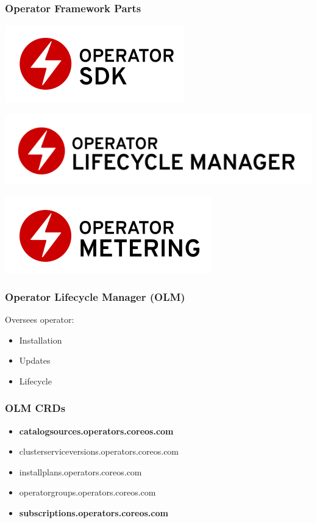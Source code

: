 \documentclass[aspectratio=169]{beamer}
\begin{document}
\begin{frame}
  \frametitle{Operator Framework Parts}

  \includegraphics[scale=.50]{images/operator_logo_sdk_color.png}

  \includegraphics[scale=.50]{images/operator_logo_lifecycle_manager_color.png}

  \includegraphics[scale=.50]{images/operator_logo_metering_color.png}

\end{frame}

\begin{frame}
  \frametitle{Operator Lifecycle Manager (OLM)}

  Oversees operator:
  \begin{itemize}
  \item Installation
  \item Updates
  \item Lifecycle
  \end{itemize}

\end{frame}

\begin{frame}
  \frametitle{OLM CRDs}
  \begin{itemize}
    \item {\bf catalogsources.operators.coreos.com}
    \item clusterserviceversions.operators.coreos.com
    \item installplans.operators.coreos.com
    \item operatorgroups.operators.coreos.com
    \item {\bf subscriptions.operators.coreos.com}
  \end{itemize}
\end{frame}
\end{document}

